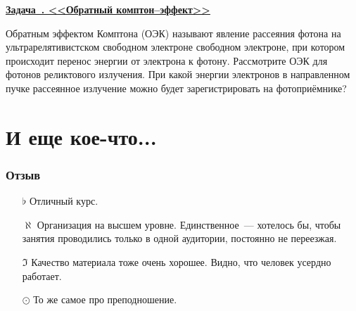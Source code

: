 \documentclass[11pt]{article}
\theoremstyle{definition}\newtheorem{defi}{Определение}
\newcounter{taskn}[section]
\newenvironment{task}[1]{%
\begin{framed}
  \noindent
  \underline{\bfseries Задача~\stepcounter{taskn}\thetaskn. <<#1>>}
  \setlength{\parindent}{0cm}
}{%
\end{framed}
}
\begin{document}
\begin{task}{Обратный комптон--эффект}

Обратным эффектом Комптона (ОЭК) называют явление рассеяния фотона на ультрарелятивистском свободном электроне свободном электроне, при котором происходит перенос энергии от электрона к фотону. Рассмотрите ОЭК для фотонов реликтового излучения. При какой энергии электронов в направленном пучке рассеянное излучение можно будет зарегистрировать на фотоприёмнике?

\end{task}


\part{И еще кое-что...}

\section{Отзыв}

\begin{itemize}

\item[$\flat$] Отличный курс.
\item[$\aleph$] Организация на высшем уровне. Единственное~--- хотелось бы, чтобы занятия проводились только в одной аудитории, постоянно не переезжая.
\item[$\Im$] Качество материала тоже очень хорошее. Видно, что человек усердно работает.
\item[$\odot$] То же самое про преподношение.

\end{itemize}
\end{document}
